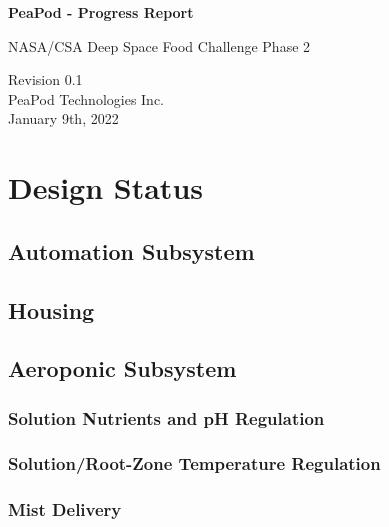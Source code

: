 \documentclass{../tex/report}
\begin{document}
\begin{titlepage}
    \begin{center}
        \vspace*{1.2cm}

        \textbf{\large{PeaPod - Progress Report}}

        \vspace{0.5cm}

        NASA/CSA Deep Space Food Challenge Phase 2

        \vfill
        
        \vspace{.75cm}

        Revision 0.1\\
        PeaPod Technologies Inc.\\
        January 9th, 2022

    \end{center}
\end{titlepage}

\thispagestyle{plain}

\tableofcontents
\newpage

\section{Design Status}
\subsection{Automation Subsystem}
\subsection{Housing}
\subsection{Aeroponic Subsystem}
\subsubsection{Solution Nutrients and pH Regulation}
\subsubsection{Solution/Root-Zone Temperature Regulation}
\subsubsection{Mist Delivery}
\end{document}

